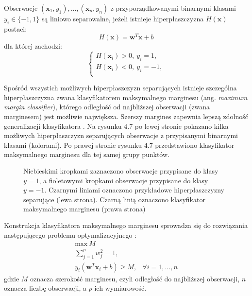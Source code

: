 \documentclass[notitlepage]{report}
\begin{document}
Obserwacje $(\mathbf{x}_1,y_1), ..., (\mathbf{x}_n,y_n)$ z przyporządkowanymi binarnymi klasami $y_i \in \{-1,1\}$ są liniowo separowalne, jeżeli istnieje hiperpłaszczyzna $H(\mathbf{x})$ postaci:
\begin{equation}
H(\mathbf{x}) = \mathbf{w}^T\mathbf{x} + b
\end{equation}
dla której zachodzi:
\begin{equation}
\begin{cases}
H(\mathbf{x}_i) > 0,\ y_i = 1, \\
H(\mathbf{x}_i) < 0,\ y_i = -1, \\
\end{cases}
\end{equation}

Spośród wszystich możliwych hiperpłaszczyzn separujących istnieje szczególna hiperpłaszczyzna zwana klasyfikatorem maksymalnego marginesu (ang. \textit{maximum margin classifier}), którego odległość od najbliższej obserwacji (zwana marginesem) jest możliwie największa. Szerszy margines zapewnia lepszą zdolność generalizacji klasyfikatora \cite{islr} \cite{eslii}. Na rysunku 4.7 po lewej stronie pokazano kilka możliwych hiperpłaszczyzn separujących obserwacje z przypisanymi binarnymi klasami (kolorami). Po prawej stronie rysunku 4.7 przedstawiono klasyfikator maksymalnego marginesu dla tej samej grupy punktów. 
\begin{figure}[H]
	\centering
	\caption{Niebieskimi kropkami zaznaczono obserwacje przypisane do klasy $y = 1$, a fioletowymi kropkami obserwacje przypisane do klasy $y = -1$. Czarnymi liniami oznaczono przykładowe hiperpłaszczyzny separujące (lewa strona). Czarną linią oznaczono klasyfikator maksymalnego marginesu (prawa strona) \cite{islr}}
\end{figure}
Konstrukcja klasyfikatora maksymalnego marginesu sprowadza się do rozwiązania następującego problemu optymalizacyjnego \cite{islr} \cite{eslii}:
\begin{equation}
\begin{array}{lll}
\text{max}\ M &\\
\sum_{j=1}^{p} w_{j}^{2} = 1, &\\
y_i(\mathbf{w}^T\mathbf{x}_i + b) \ge M, & \forall i = 1,...,n
\end{array}
\end{equation}
gdzie $M$ oznacza szerokość marginesu, czyli odległość do najbliższej obserwacji, $n$ oznacza liczbę obserwacji, a $p$ ich wymiarowość.
\end{document}
